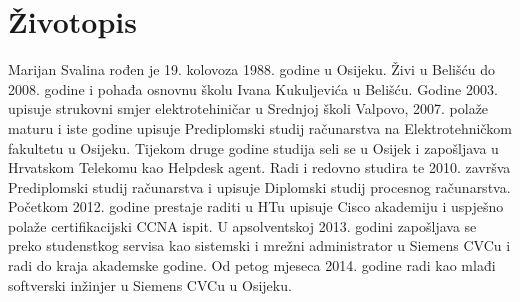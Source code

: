 \newpage

\section*{Životopis} %
\label{sec:Životopis}

Marijan Svalina rođen je 19. kolovoza 1988. godine u Osijeku. Živi u
Belišću do 2008. godine i pohađa osnovnu školu Ivana Kukuljevića u
Belišću. Godine 2003. upisuje strukovni smjer elektrotehiničar u
Srednjoj školi Valpovo, 2007. polaže maturu i iste godine upisuje
Prediplomski studij računarstva na Elektrotehničkom fakultetu u Osijeku.
Tijekom druge godine studija seli se u Osijek i zapošljava u Hrvatskom
Telekomu kao Helpdesk agent. Radi i redovno studira te 2010. završva
Prediplomski studij računarstva i upisuje Diplomski studij procesnog
računarstva. Početkom 2012. godine prestaje raditi u HTu upisuje Cisco
akademiju i uspješno polaže certifikacijski CCNA ispit. U apsolventskoj
2013. godini zapošljava se preko studenstkog servisa kao sistemski i
mrežni administrator u Siemens CVCu i radi do kraja akademske godine. Od
petog mjeseca 2014. godine radi kao mlađi softverski inžinjer u Siemens
CVCu u Osijeku.




